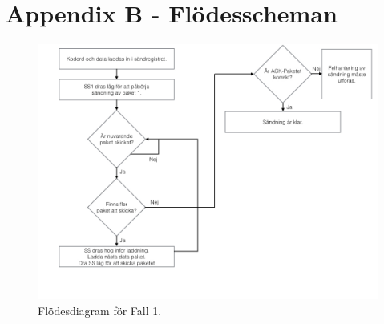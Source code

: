 \documentclass[a4paper,12pt,fleqn]{article}
\begin{document}
\newpage
\section{Appendix B - Flödesscheman}

\begin{figure}[htp] %
  \begin{center}
  \includegraphics[keepaspectratio=true,width=\linewidth]{SPIbild002.jpg}  %
  \end{center}
  \caption{Flödesdiagram för Fall 1.} %
  \label{fig:case1flow}
\end{figure}
\end{document}
